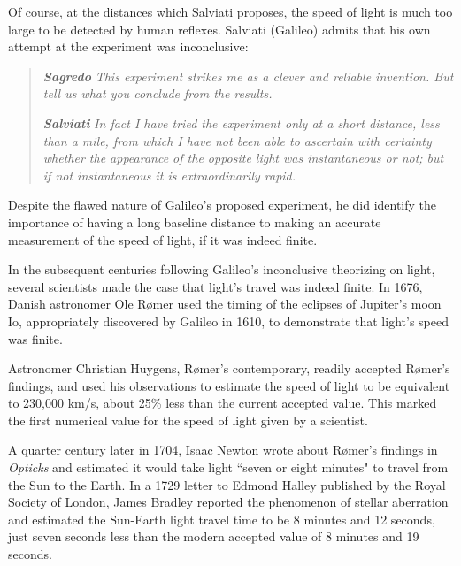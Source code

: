 \documentclass[twocolumn]{article}
\begin{document}
		Of course, at the distances which Salviati proposes, the speed of light is much too large to be detected by human reflexes. 
		Salviati (Galileo) admits that his own attempt at the experiment was inconclusive:
		
		\begin{quotation}
			\noindent
			\textit{\textbf{Sagredo}} \newline
			\textit{This experiment strikes me as a clever and reliable invention. 
			But tell us what you conclude from the results.}
			
			\noindent \newline
			\textit{\textbf{Salviati}} \newline
			\textit{In fact I have tried the experiment only at a short distance, less than a mile, from
			which I have not been able to ascertain with certainty whether the appearance of the opposite light was instantaneous or not; but if not instantaneous it is extraordinarily rapid.}
		\end{quotation}
		
		Despite the flawed nature of Galileo's proposed experiment, he did identify the importance of having a long baseline distance to making an accurate measurement of the speed of light, if it was indeed finite.
		
		In the subsequent centuries following Galileo's inconclusive theorizing on light, several scientists made the case that light's travel was indeed finite. 
		In 1676, Danish astronomer Ole R\o{}mer used the timing of the eclipses of Jupiter's moon Io, appropriately discovered by Galileo in 1610, to demonstrate that light's speed was finite.\cite{romer_motion_1677}
		
		Astronomer Christian Huygens, R\o{}mer's contemporary, readily accepted R\o{}mer's findings, and used his observations to estimate the speed of light to be equivalent to 230,000 km/s, about 25\% less than the current accepted value.
		This marked the first numerical value for the speed of light given by a scientist.\cite{bobis_cassini_2008}
		
		A quarter century later in 1704, Isaac Newton wrote about R\o{}mer's findings in \textit{Opticks} and estimated it would take light ``seven or eight minutes" to travel from the Sun to the Earth.\cite{newton_opticks_1704} 
		In a 1729 letter to Edmond Halley published by the Royal Society of London, James Bradley reported the phenomenon of stellar aberration and estimated the Sun-Earth light travel time to be 8 minutes and 12 seconds, just seven seconds less than the modern accepted value of 8 minutes and 19 seconds.\cite{bradley_account_1729}
		
\end{document}
